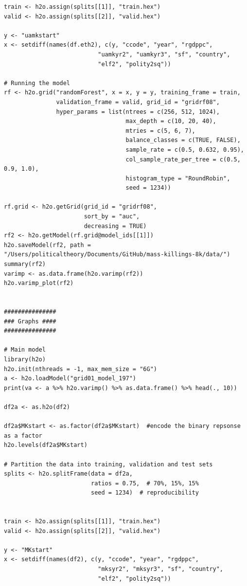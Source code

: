 \documentclass[a4paper,12pt]{article}
\begin{document}
\begin{verbatim}
train <- h2o.assign(splits[[1]], "train.hex")   
valid <- h2o.assign(splits[[2]], "valid.hex") 

y <- "uamkstart"
x <- setdiff(names(df.eth2), c(y, "ccode", "year", "rgdppc",
                           "uamkyr2", "uamkyr3", "sf", "country",
                           "elf2", "polity2sq")) 

# Running the model
rf <- h2o.grid("randomForest", x = x, y = y, training_frame = train, 
               validation_frame = valid, grid_id = "gridrf08",
               hyper_params = list(ntrees = c(256, 512, 1024),
                                   max_depth = c(10, 20, 40),
                                   mtries = c(5, 6, 7),
                                   balance_classes = c(TRUE, FALSE),
                                   sample_rate = c(0.5, 0.632, 0.95),
                                   col_sample_rate_per_tree = c(0.5, 0.9, 1.0),
                                   histogram_type = "RoundRobin",
                                   seed = 1234)) 

rf.grid <- h2o.getGrid(grid_id = "gridrf08",
                       sort_by = "auc",
                       decreasing = TRUE)
rf2 <- h2o.getModel(rf.grid@model_ids[[1]])
h2o.saveModel(rf2, path = "/Users/politicaltheory/Documents/GitHub/mass-killings-8k/data/")
summary(rf2)
varimp <- as.data.frame(h2o.varimp(rf2))
h2o.varimp_plot(rf2)


###############
### Graphs ####
###############

# Main model
library(h2o)
h2o.init(nthreads = -1, max_mem_size = "6G") 
a <- h2o.loadModel("grid01_model_197")
print(va <- a %>% h2o.varimp() %>% as.data.frame() %>% head(., 10))

df2a <- as.h2o(df2)

df2a$MKstart <- as.factor(df2a$MKstart)  #encode the binary repsonse as a factor
h2o.levels(df2a$MKstart)

# Partition the data into training, validation and test sets
splits <- h2o.splitFrame(data = df2a, 
                         ratios = 0.75,  # 70%, 15%, 15%
                         seed = 1234)  # reproducibility


train <- h2o.assign(splits[[1]], "train.hex")   
valid <- h2o.assign(splits[[2]], "valid.hex") 

y <- "MKstart"
x <- setdiff(names(df2), c(y, "ccode", "year", "rgdppc",
                           "mksyr2", "mksyr3", "sf", "country",
                           "elf2", "polity2sq"))  


\end{verbatim}
\end{document}
